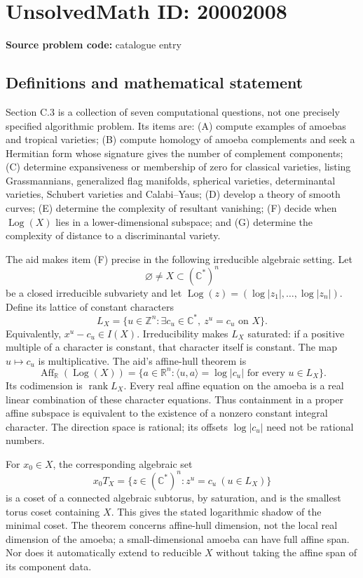 \documentclass[11pt]{article}
\newcommand{\Z}{\mathbb{Z}}
\newcommand{\R}{\mathbb{R}}
\newcommand{\C}{\mathbb{C}}
\begin{document}
\section*{UnsolvedMath ID: 20002008}
\textbf{Source problem code:} catalogue entry
\subsection{Definitions and mathematical statement}
Section C.3 is a collection of seven computational questions, not one precisely specified algorithmic problem. Its items are: (A) compute examples of amoebas and tropical varieties; (B) compute homology of amoeba complements and seek a Hermitian form whose signature gives the number of complement components; (C) determine expansiveness or membership of zero for classical varieties, listing Grassmannians, generalized flag manifolds, spherical varieties, determinantal varieties, Schubert varieties and Calabi--Yaus; (D) develop a theory of smooth curves; (E) determine the complexity of resultant vanishing; (F) decide when \(\operatorname{Log}(X)\) lies in a lower-dimensional subspace; and (G) determine the complexity of distance to a discriminantal variety.

The aid makes item (F) precise in the following irreducible algebraic setting. Let
\[
 \varnothing\ne X\subset(\C^*)^n
\]
be a closed irreducible subvariety and let
\(\operatorname{Log}(z)=(\log|z_1|,\ldots,\log|z_n|)\).
Define its lattice of constant characters
\[
 L_X=\{u\in\Z^n:\exists c_u\in\C^*,\ z^u=c_u\text{ on }X\}.
\]
Equivalently, \(x^u-c_u\in I(X)\). Irreducibility makes \(L_X\) saturated: if a positive multiple of a character is constant, that character itself is constant. The map \(u\mapsto c_u\) is multiplicative. The aid's affine-hull theorem is
\[
 \operatorname{Aff}_{\R}(\operatorname{Log}(X))
 =\{a\in\R^n:\langle u,a\rangle=\log|c_u|
                         \text{ for every }u\in L_X\}.
\]
Its codimension is \(\operatorname{rank}L_X\). Every real affine equation on the amoeba is a real linear combination of these character equations. Thus containment in a proper affine subspace is equivalent to the existence of a nonzero constant integral character. The direction space is rational; its offsets \(\log|c_u|\) need not be rational numbers.

For \(x_0\in X\), the corresponding algebraic set
\[
 x_0T_X=\{z\in(\C^*)^n:z^u=c_u\ (u\in L_X)\}
\]
is a coset of a connected algebraic subtorus, by saturation, and is the smallest torus coset containing \(X\). This gives the stated logarithmic shadow of the minimal coset. The theorem concerns affine-hull dimension, not the local real dimension of the amoeba; a small-dimensional amoeba can have full affine span. Nor does it automatically extend to reducible \(X\) without taking the affine span of its component data.
\end{document}
